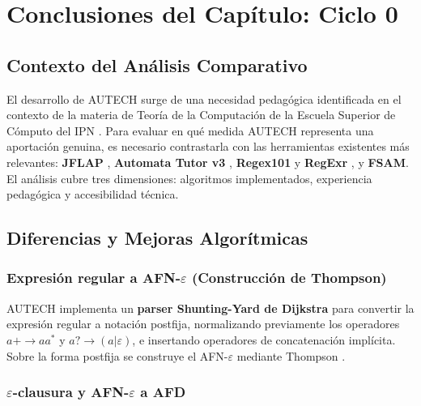 \newpage
\section{Conclusiones del Capítulo: Ciclo 0}
\label{sec:conclusiones_ciclo0}

\subsection{Contexto del Análisis Comparativo}
\label{subsec:contexto_comparativo}

El desarrollo de AUTECH surge de una necesidad pedagógica identificada en el contexto de la materia
de Teoría de la Computación de la Escuela Superior de Cómputo del IPN \cite{ipn2020}\cite{escom2016}.
Para evaluar en qué medida AUTECH representa una aportación genuina, es necesario contrastarla con
las herramientas existentes más relevantes: \textbf{JFLAP} \cite{rodger2006}\cite{sipser2012},
\textbf{Automata Tutor v3} \cite{aichernig2022}, \textbf{Regex101} \cite{fycikas2021} y
\textbf{RegExr} \cite{skinner2021}, y \textbf{FSAM}. El análisis cubre tres dimensiones:
algoritmos implementados, experiencia pedagógica y accesibilidad técnica.

\subsection{Diferencias y Mejoras Algorítmicas}
\label{subsec:diferencias_algoritmicas}

\subsubsection*{Expresión regular a AFN-$\varepsilon$ (Construcción de Thompson)}

AUTECH implementa un \textbf{parser Shunting-Yard de Dijkstra} \cite{aho1995} para convertir la
expresión regular a notación postfija, normalizando previamente los operadores $a+ \rightarrow aa^*$
y $a? \rightarrow (a|\varepsilon)$, e insertando operadores de concatenación implícita. Sobre la
forma postfija se construye el AFN-$\varepsilon$ mediante Thompson \cite{thompson1968}.

\subsubsection*{$\varepsilon$-clausura y AFN-$\varepsilon$ a AFD}


